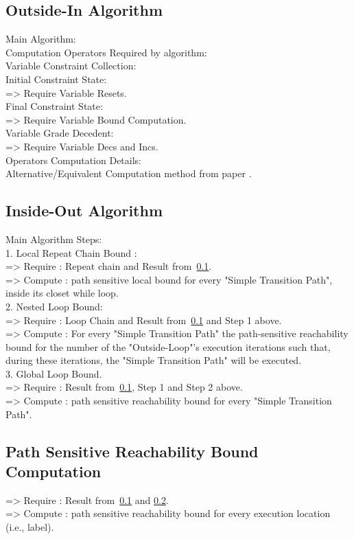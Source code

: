 \documentclass[sigplan,10pt,review,anonymous]{acmart}
\begin{document}
\subsection{Outside-In Algorithm}
\label{sec:outsidein}
Main Algorithm:
\\
Computation Operators Required by algorithm:
\\
Variable Constraint Collection:
\\
Initial Constraint State:
\\
=> Require Variable Resets.
\\
Final Constraint State:
\\
 => Require Variable Bound Computation.
\\
Variable Grade Decedent:
\\
 => Require Variable Decs and Incs.
\\
Operators Computation Details:
\\
Alternative/Equivalent Computation method from paper \cite{GulwaniJK09}.
\subsection{Inside-Out Algorithm}
\label{sec:insideout}
Main Algorithm Steps:
\\
1. Local Repeat Chain Bound :
\\
=> Require : Repeat chain and Result from~\ref{sec:outsidein}.
\\
=> Compute : path sensitive local bound for every "Simple Transition Path", inside its closet while loop.
\\
2. Nested Loop Bound:
\\
=> Require : Loop Chain and Result from~\ref{sec:outsidein} and Step 1 above.
\\
=> Compute : For every "Simple Transition Path" the path-sensitive
reachability bound for the number of the "Outside-Loop"'s execution iterations
such that, during these iterations, the "Simple Transition Path" will be executed. 
\\
3. Global Loop Bound.
\\
=> Require : Result from~\ref{sec:outsidein}, Step 1 and Step 2 above.
\\
=> Compute : path sensitive reachability bound for every "Simple Transition Path".
%
\subsection{Path Sensitive Reachability Bound Computation}
=> Require : Result from~\ref{sec:outsidein} and \ref{sec:insideout}.
\\
=> Compute : path sensitive reachability bound for every execution location (i.e., label).
\end{document}
